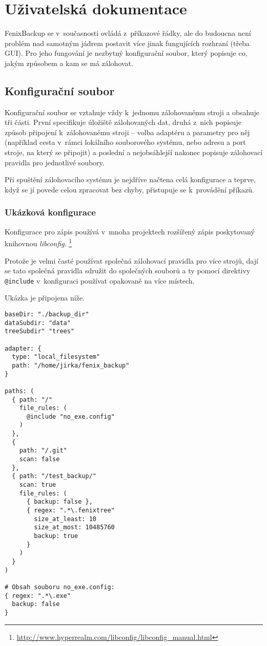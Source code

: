 \chapter{Uživatelská dokumentace}

FenixBackup se v~současnosti ovládá z~příkazové řádky, ale do budoucna není
problém nad samotným jádrem postavit více jinak fungujících rozhraní (třeba
GUI). Pro jeho fungování je nezbytný konfigurační soubor, který popisuje co,
jakým způsobem a kam se má zálohovat.

\section{Konfigurační soubor}

Konfigurační soubor se vztahuje vždy k~jednomu zálohovanému stroji a obsahuje
tři části. První specifikuje úložiště zálohovaných dat, druhá z~nich popisuje
způsob připojení k~zálohovanému stroji -- volba adaptéru a parametry pro něj
(například cesta v~rámci lokálního souborového systému, nebo adresu a port
stroje, na který se připojit) a poslední a nejobsáhlejší nakonec popisuje
zálohovací pravidla pro jednotlivé soubory.

Při spuštění zálohovacího systému je nejdříve načtena celá konfigurace a teprve,
když se jí povede celou zpracovat bez chyby, přistupuje se k~provádění příkazů.

\subsection{Ukázková konfigurace}

Konfigurace pro zápis používá v~mnoha projektech rozšířený zápis poskytovaný
knihovnou {\it libconfig}.%
\footnote{\url{http://www.hyperrealm.com/libconfig/libconfig_manual.html}}

Protože je velmi časté používat společná zálohovací pravidla pro více strojů,
dají se tato společná pravidla sdružit do společných souborů a ty pomocí
direktivy \texttt{@include} v~konfiguraci používat opakovaně na více místech.

Ukázka je připojena níže.

\begin{verbatim}
baseDir: "./backup_dir"
dataSubdir: "data"
treeSubdir" "trees"

adapter: {
  type: "local_filesystem"
  path: "/home/jirka/fenix_backup"
}

paths: (
  { path: "/"
    file_rules: (
      @include "no_exe.config"
    )
  },
  {
    path: "/.git"
    scan: false
  },
  { path: "/test_backup/"
    scan: true
    file_rules: (
      { backup: false },
      { regex: ".*\.fenixtree"
        size_at_least: 10
        size_at_most: 10485760
        backup: true
      }
    )
  }
)

# Obsah souboru no_exe.config:
{ regex: ".*\.exe"
  backup: false
}
\end{verbatim}

